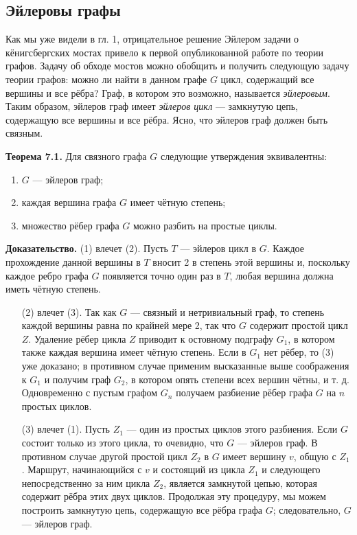 \subsection{Эйлеровы графы}

Как мы уже видели в гл. 1, отрицательное решение Эйлером задачи о кёнигсбергских мостах привело к первой опубликованной работе по теории графов. Задачу об обходе мостов можно обобщить и получить следующую задачу теории графов: можно ли найти в данном графе \(G\) цикл, содержащий все вершины и все рёбра? Граф, в котором это возможно, называется \textit{эйлеровым}. Таким образом, эйлеров граф имеет \textit{эйлеров цикл} — замкнутую цепь, содержащую все вершины и все рёбра. Ясно, что эйлеров граф должен быть связным.

\textbf{Теорема 7.1.} Для связного графа \(G\) следующие утверждения эквивалентны:
\begin{enumerate}
    \item \(G\) — эйлеров граф;
    \item каждая вершина графа \(G\) имеет чётную степень;
    \item множество рёбер графа \(G\) можно разбить на простые циклы.
\end{enumerate}


\textbf{Доказательство.} (1) влечет (2). Пусть \(T\) — эйлеров цикл в \(G\). Каждое прохождение данной вершины в \(T\) вносит 2 в степень этой вершины и, поскольку каждое ребро графа \(G\) появляется точно один раз в \(T\), любая вершина должна иметь чётную степень.

\begin{enumerate}
    \item[(2)] влечет (3). Так как \( G \) — связный и нетривиальный граф, то степень каждой вершины равна по крайней мере 2, так что \( G \) содержит простой цикл \( Z \). Удаление рёбер цикла \( Z \) приводит к остовному подграфу \( G_1 \), в котором также каждая вершина имеет чётную степень. Если в \( G_1 \) нет рёбер, то (3) уже доказано; в противном случае применим высказанные выше соображения к \( G_1 \) и получим граф \( G_2 \), в котором опять степени всех вершин чётны, и т. д. Одновременно с пустым графом \( G_n \) получаем разбиение рёбер графа \( G \) на \( n \) простых циклов.

    \item[(3)] влечет (1). Пусть \( Z_1 \) — один из простых циклов этого разбиения. Если \( G \) состоит только из этого цикла, то очевидно, что \( G \) — эйлеров граф. В противном случае другой простой цикл \( Z_2 \) в \( G \) имеет вершину \( v \), общую с \( Z_1 \). Маршрут, начинающийся с \( v \) и состоящий из цикла \( Z_1 \) и следующего непосредственно за ним цикла \( Z_2 \), является замкнутой цепью, которая содержит рёбра этих двух циклов. Продолжая эту процедуру, мы можем построить замкнутую цепь, содержащую все рёбра графа \( G \); следовательно, \( G \) — эйлеров граф.
\end{enumerate}

